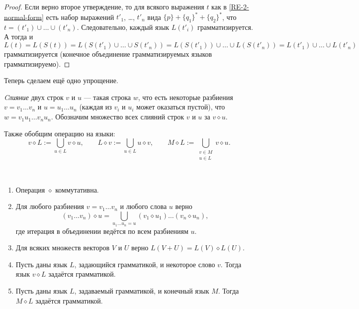 \documentclass[12pt,a4paper]{article}
\begin{document}
\begin{problem}{8}
\begin{enumerate}
\begin{proof}
                    Если верно второе утверждение, то для всякого выражения $t$ как в \ref{RE-2-normal-form} есть набор выражений $t'_1$, \dots, $t'_n$ вида $\{p\} + \{q_1\}^* + \{q_2\}^*$, что $t = (t'_1) \cup \dots \cup (t'_n)$. Следовательно, каждый язык $L(t'_i)$ грамматизируется. А тогда и
                    \[
                        L(t)
                        = L(S(t))
                        = L(S(t'_1) \cup \dots \cup S(t'_n))
                        = L(S(t'_1)) \cup \dots \cup L(S(t'_n))
                        = L(t'_1) \cup \dots \cup L(t'_n)
                    \]
                    грамматизируется (конечное объединение грамматизируемых языков грамматизируемо).
                \end{proof}

                Теперь сделаем ещё одно упрощение.

                \begin{definition}
                    \emph{Cлияние} двух строк $v$ и $u$ --- такая строка $w$, что есть некоторые разбиения $v = v_1\dots v_n$ и $u = u_1\dots u_n$ (каждая из $v_i$ и $u_i$ может оказаться пустой), что $w = v_1 u_1 \dots v_n u_n$. Обозначим множество всех слияний строк $v$ и $u$ за $v \diamond u$.

                    Также обобщим операцию на языки:
                    \[
                        v \diamond L := \bigcup_{u \in L} v \diamond u,
                        \qquad
                        L \diamond v := \bigcup_{u \in L} u \diamond v,
                        \qquad
                        M \diamond L := \bigcup_{\substack{v \in M\\u \in L}} v \diamond u.
                    \]
                \end{definition}

                \begin{lemma}\ 
                    \begin{enumerate}
                        \item Операция $\diamond$ коммутативна.
                        \item Для любого разбиения $v = v_1 \dots v_n$ и любого слова $u$ верно
                            \[(v_1 \dots v_n) \diamond u = \bigcup_{u_1 \dots u_n = u} (v_1 \diamond u_1) \dots (v_n \diamond u_n),\]
                            где итерация в объединении ведётся по всем разбиениям $u$.
                        \item Для всяких множеств векторов $V$ и $U$ верно $L(V + U) = L(V) \diamond L(U)$.
                        \item Пусть даны язык $L$, задающийся грамматикой, и некоторое слово $v$. Тогда язык $v \diamond L$ задаётся грамматикой.
                        \item Пусть даны язык $L$, задаваемый грамматикой, и конечный язык $M$. Тогда $M \diamond L$ задаётся грамматикой.
                    \end{enumerate}
                \end{lemma}


\end{enumerate}
\end{problem}
\end{document}
